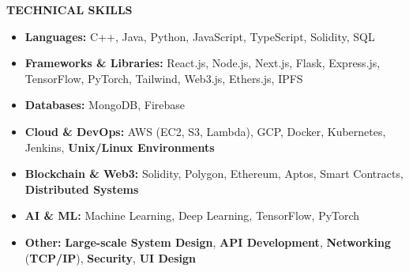 \documentclass[a4paper,10pt]{article}
\newcommand{\resheading}[1]{%
  \vspace{1em}%
  \noindent\colorbox{mygrey}{%
    \parbox{\dimexpr\linewidth-2\fboxsep\relax}{%
      \textbf{#1}%
    }%
  }%
  \vspace{0.6em}%
}
\begin{document}
\resheading{TECHNICAL SKILLS}
\vspace{0.4em}
\begin{itemize}
  \item \textbf{Languages:} C++, Java, Python, JavaScript, TypeScript, Solidity, SQL
  \item \textbf{Frameworks \& Libraries:} React.js, Node.js, Next.js, Flask, Express.js, TensorFlow, PyTorch, Tailwind, Web3.js, Ethers.js, IPFS
  \item \textbf{Databases:} MongoDB, Firebase
  \item \textbf{Cloud \& DevOps:} AWS (EC2, S3, Lambda), GCP, Docker, Kubernetes, Jenkins, \textbf{Unix/Linux Environments}
  \item \textbf{Blockchain \& Web3:} Solidity, Polygon, Ethereum, Aptos, Smart Contracts, \textbf{Distributed Systems}
  \item \textbf{AI \& ML:} Machine Learning, Deep Learning, TensorFlow, PyTorch
  \item \textbf{Other:} \textbf{Large-scale System Design}, \textbf{API Development}, \textbf{Networking} (\textbf{TCP/IP}), \textbf{Security}, \textbf{UI Design}
\end{itemize}
\end{document}

